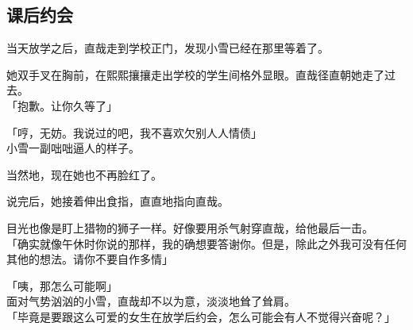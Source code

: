 \subsection{课后约会}

当天放学之后，直哉走到学校正门，发现小雪已经在那里等着了。

她双手叉在胸前，在熙熙攘攘走出学校的学生间格外显眼。直哉径直朝她走了过去。\\

「抱歉。让你久等了」

「哼，无妨。我说过的吧，我不喜欢欠别人人情债」\\

小雪一副咄咄逼人的样子。

当然地，现在她也不再脸红了。

说完后，她接着伸出食指，直直地指向直哉。

目光也像是盯上猎物的狮子一样。好像要用杀气射穿直哉，给他最后一击。\\

「确实就像午休时你说的那样，我的确想要答谢你。但是，除此之外我可没有任何其他的想法。请你不要自作多情」

「咦，那怎么可能啊」\\

面对气势汹汹的小雪，直哉却不以为意，淡淡地耸了耸肩。\\

「毕竟是要跟这么可爱的女生在放学后约会，怎么可能会有人不觉得兴奋呢？」

